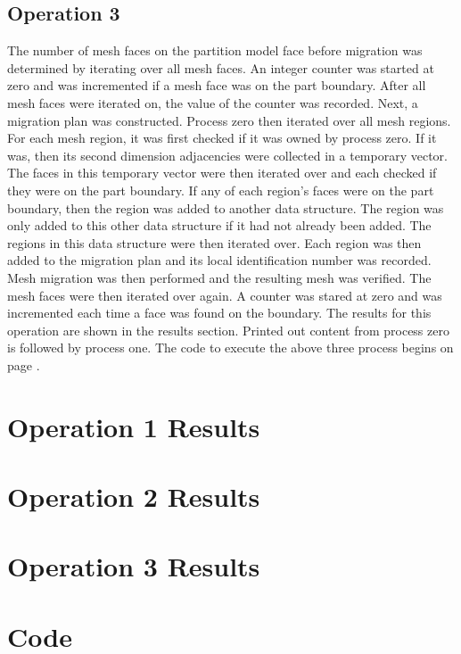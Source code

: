 \documentclass[a4paper, 12pt]{article}
\begin{document}
\subsection*{Operation 3} \label{sec:sub:op3}

The number of mesh faces on the partition model face before migration
was determined by iterating over all mesh faces. An integer counter
was started at zero and was incremented if a mesh face was on the 
part boundary. After all mesh faces were iterated on, the value of 
the counter was recorded. Next, a migration plan was constructed. 
Process zero then iterated over all mesh regions. For each mesh 
region, it was first checked if it was owned by process zero. If it
was, then its second dimension adjacencies were collected in a 
temporary vector. The faces in this temporary vector were then 
iterated over and each checked if they were on the part boundary.
If any of each region's faces were on the part boundary, then the 
region was added to another data structure. The region was only added
to this other data structure if it had not already been added. The 
regions in this data structure were then iterated over. Each region was 
then added to the migration plan and its local identification number 
was recorded. Mesh migration was then performed and the resulting mesh
was verified. The mesh faces were then iterated over again. A counter 
was stared at zero and was incremented each time a face was found on 
the boundary. The results for this operation are shown in the
results section.
Printed out content from process zero is followed
by process one. The code to execute the above three process begins
on page \pageref{sec:code}.

\section*{Operation 1 Results} \label{sec:results1}


\section*{Operation 2 Results} \label{sec:results2}


\section*{Operation 3 Results} \label{sec:results3}



\newpage
\section*{Code} \label{sec:code}

\end{document}
